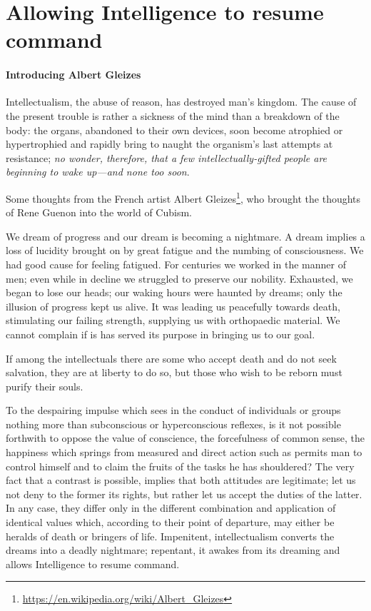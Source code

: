 \section{Allowing Intelligence to resume command}

\paragraph{Introducing Albert Gleizes}

\begin{quotex}
Intellectualism, the abuse of reason, has destroyed man's kingdom. The cause of the present trouble is rather a sickness of the mind than a breakdown of the body: the organs, abandoned to their own devices, soon become atrophied or hypertrophied and rapidly bring to naught the organism's last attempts at resistance; \emph{no wonder, therefore, that a few intellectually-gifted people are beginning to wake up---and none too soon}.
\end{quotex}

Some thoughts from the French artist Albert Gleizes\footnote{\url{https://en.wikipedia.org/wiki/Albert\_Gleizes}}, who brought the thoughts of Rene Guenon into the world of Cubism.

\begin{quotationx}
We dream of progress and our dream is becoming a nightmare. A dream implies a loss of lucidity brought on by great fatigue and the numbing of consciousness. We had good cause for feeling fatigued. For centuries we worked in the manner of men; even while in decline we struggled to preserve our nobility. Exhausted, we began to lose our heads; our waking hours were haunted by dreams; only the illusion of progress kept us alive. It was leading us peacefully towards death, stimulating our failing strength, supplying us with orthopaedic material. We cannot complain if is has served its purpose in bringing us to our goal.

If among the intellectuals there are some who accept death and do not seek salvation, they are at liberty to do so, but those who wish to be reborn must purify their souls.

To the despairing impulse which sees in the conduct of individuals or groups nothing more than subconscious or hyperconscious reflexes, is it not possible forthwith to oppose the value of conscience, the forcefulness of common sense, the happiness which springs from measured and direct action such as permits man to control himself and to claim the fruits of the tasks he has shouldered? The very fact that a contrast is possible, implies that both attitudes are legitimate; let us not deny to the former its rights, but rather let us accept the duties of the latter. In any case, they differ only in the different combination and application of identical values which, according to their point of departure, may either be heralds of death or bringers of life. Impenitent, intellectualism converts the dreams into a deadly nightmare; repentant, it awakes from its dreaming and allows Intelligence to resume command.
\end{quotationx}




